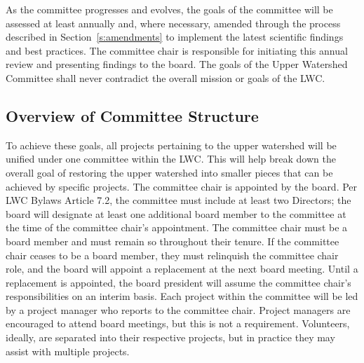 \documentclass[letterpaper,11pt,leqno]{article}
\begin{document}
As the committee progresses and evolves, the goals of the committee will be assessed at least annually and, where necessary, amended through the process described in Section~\ref{s:amendments} to implement the latest scientific findings and best practices. The committee chair is responsible for initiating this annual review and presenting findings to the board. The goals of the Upper Watershed Committee
shall never contradict the overall mission or goals of the LWC.

\subsection{Overview of Committee Structure}
To achieve these goals, all projects pertaining to the upper watershed will be unified under one committee within the LWC.
This will help break down the overall goal of restoring the upper watershed into smaller pieces that can be achieved by specific projects.
The committee chair is appointed by the board. Per LWC Bylaws Article 7.2, the committee must include at least two Directors; the board will designate at least one additional board member to the committee at the time of the committee chair's appointment. The committee chair must be a board member and must remain so throughout their tenure. If the committee chair ceases to be a board member, they must relinquish the committee chair role, and the board will appoint a replacement at the next board meeting. Until a replacement is appointed, the board president will assume the committee chair's responsibilities on an interim basis. Each project within the committee will be led by a project manager who reports to the committee chair.
Project managers are encouraged to attend board meetings, but this is not a requirement. Volunteers, ideally, are separated into their respective projects, but in practice they may assist with multiple projects.

\begin{center}
\end{center}
\end{document}
